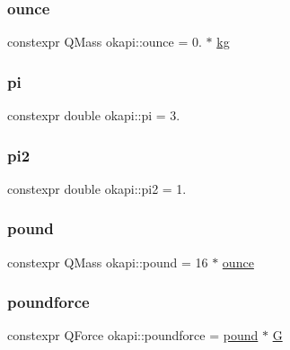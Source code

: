 \mbox{\label{namespaceokapi_aa03bea36d07db8710819da96fe675a74}} 
\subsubsection{\texorpdfstring{ounce}{ounce}}
{\footnotesize\ttfamily constexpr Q\+Mass okapi\+::ounce = 0. $\ast$ \mbox{\hyperlink{namespaceokapi_afcc67eb55c70e21f82cbee49aa19d05a}{kg}}}

\mbox{\label{namespaceokapi_a3456eff6b02ec38b7771c227250f101c}} 
\subsubsection{\texorpdfstring{pi}{pi}}
{\footnotesize\ttfamily constexpr double okapi\+::pi = 3.\hspace{0.3cm}{\ttfamily [static]}}

\mbox{\label{namespaceokapi_a0f3c3909136daa4ae9532361a870a213}} 
\subsubsection{\texorpdfstring{pi2}{pi2}}
{\footnotesize\ttfamily constexpr double okapi\+::pi2 = 1.\hspace{0.3cm}{\ttfamily [static]}}

\mbox{\label{namespaceokapi_a15f5612272759c7efdcab4bae5b4fa09}} 
\subsubsection{\texorpdfstring{pound}{pound}}
{\footnotesize\ttfamily constexpr Q\+Mass okapi\+::pound = 16 $\ast$ \mbox{\hyperlink{namespaceokapi_aa03bea36d07db8710819da96fe675a74}{ounce}}}

\mbox{\label{namespaceokapi_a41fe97a6b959d171539cd48908544f77}} 
\subsubsection{\texorpdfstring{poundforce}{poundforce}}
{\footnotesize\ttfamily constexpr Q\+Force okapi\+::poundforce = \mbox{\hyperlink{namespaceokapi_a15f5612272759c7efdcab4bae5b4fa09}{pound}} $\ast$ \mbox{\hyperlink{namespaceokapi_a6e00ff72f863a56a3fc99ca94f106a5a}{G}}}

